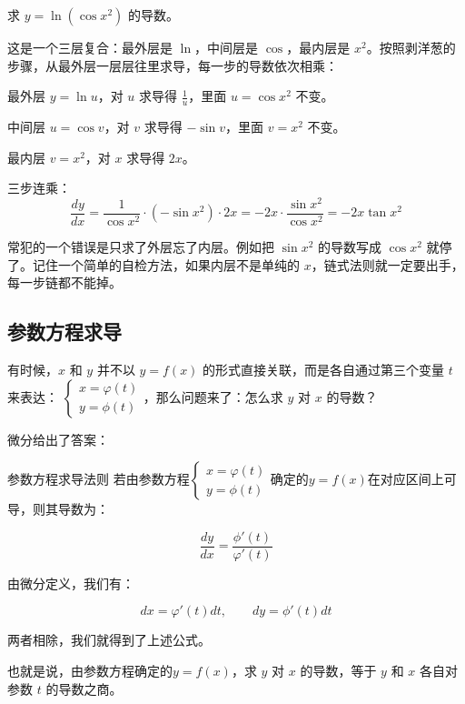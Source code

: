 \begin{myexample}
  求 $y = \ln(\cos x^2)$ 的导数。

  这是一个三层复合：最外层是 $\ln$，中间层是 $\cos$，最内层是 $x^2$。按照剥洋葱的步骤，从最外层一层层往里求导，每一步的导数依次相乘：

  最外层 $y = \ln u$，对 $u$ 求导得 $\frac{1}{u}$，里面 $u = \cos x^2$ 不变。

  中间层 $u = \cos v$，对 $v$ 求导得 $-\sin v$，里面 $v = x^2$ 不变。

  最内层 $v = x^2$，对 $x$ 求导得 $2x$。

  三步连乘：
  \[
  \frac{dy}{dx} = \frac{1}{\cos x^2} \cdot (-\sin x^2) \cdot 2x = -2x \cdot \frac{\sin x^2}{\cos x^2} = -2x \tan x^2
  \]

\end{myexample}

常犯的一个错误是只求了外层忘了内层。例如把 $\sin x^2$ 的导数写成 $\cos x^2$ 就停了。记住一个简单的自检方法，如果内层不是单纯的 $x$，链式法则就一定要出手，每一步链都不能掉。

\subsection{参数方程求导}

有时候，$x$ 和 $y$ 并不以 $y = f(x)$ 的形式直接关联，而是各自通过第三个变量 $t$ 来表达：
\(\begin{cases}
x = \varphi (t) \\
y = \phi (t)
\end{cases}\)，那么问题来了：怎么求 $y$ 对 $x$ 的导数？

微分给出了答案：

\begin{theorem}{参数方程求导法则}{}
  若由参数方程\(\begin{cases}
x = \varphi (t) \\
y = \phi (t)
\end{cases}\)确定的$y=f(x)$在对应区间上可导，则其导数为：

\[
\frac{dy}{dx} = \frac{\phi' (t)}{\varphi' (t)}
\]

\end{theorem}

由微分定义，我们有：

\[
dx=\varphi' (t)dt, \qquad dy=\phi' (t)dt
\]

两者相除，我们就得到了上述公式。

也就是说，由参数方程确定的$y=f(x)$，求 $y$ 对 $x$ 的导数，等于 $y$ 和 $x$ 各自对参数 $t$ 的导数之商。

